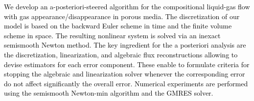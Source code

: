 \documentclass[a0,portrait]{a0poster}
\begin{document}
\begin{multicols}{2} %


\color{blue} %


\textcolor{black}{We develop an a-posteriori-steered algorithm for the compositional liquid-gas flow with gas appearance/disappearance in porous media. The discretization of our model is based on the backward Euler scheme in time and the finite volume scheme in space. The resulting nonlinear system is solved via an inexact semismooth Newton method. The key ingredient for the a posteriori analysis are the discretization, linearization, and algebraic flux reconstructions allowing to devise estimators for each error component. These enable to formulate criteria for stopping the algebraic and linearization solver whenever the corresponding error do not affect significantly the overall error.  Numerical experiments are performed using the semismooth Newton-min algorithm and the GMRES solver.}




\begin{tcolorbox}[enhanced, breakable,colback=white,frame style={left color=white!25!black,
right color=blue!75!black},
width=\dimexpr0.45\textwidth+18mm\relax,enlarge left by=0mm, title = \huge Model problem, 
bottomrule=3mm, leftrule=1mm, toptitle = 3mm, bottomtitle = 3mm, center title]


\end{tcolorbox}
\end{multicols}
\end{document}

